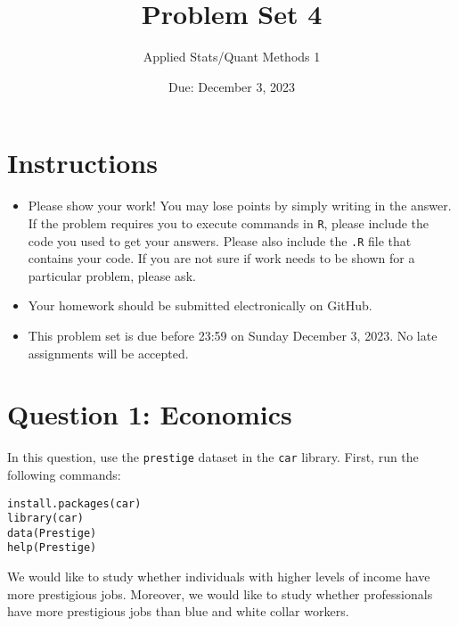 \documentclass[12pt,letterpaper]{article}
\title{Problem Set 4}
\date{Due: December 3, 2023}
\author{Applied Stats/Quant Methods 1}
\begin{document}
	\maketitle
	\section*{Instructions}
	\begin{itemize}
		\item Please show your work! You may lose points by simply writing in the answer. If the problem requires you to execute commands in \texttt{R}, please include the code you used to get your answers. Please also include the \texttt{.R} file that contains your code. If you are not sure if work needs to be shown for a particular problem, please ask.
		\item Your homework should be submitted electronically on GitHub.
		\item This problem set is due before 23:59 on Sunday December 3, 2023. No late assignments will be accepted.
	\end{itemize}



	\vspace{.5cm}
\section*{Question 1: Economics}
\vspace{.25cm}
\noindent 	
In this question, use the \texttt{prestige} dataset in the \texttt{car} library. First, run the following commands:

\begin{verbatim}
install.packages(car)
library(car)
data(Prestige)
help(Prestige)
\end{verbatim} 

	\vspace{0.25cm}


\noindent We would like to study whether individuals with higher levels of income have more prestigious jobs. Moreover, we would like to study whether professionals have more prestigious jobs than blue and white collar workers.
\end{document}
